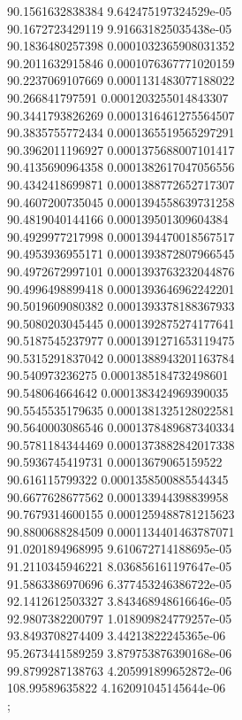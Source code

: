 {90.1561632838384 9.642475197324529e-05
 \\
90.1672723429119 9.916631825035438e-05
 \\
90.1836480257398 0.0001032365908031352
 \\
90.2011632915846 0.0001076367771020159
 \\
90.2237069107669 0.0001131483077188022
 \\
90.266841797591 0.0001203255014843307
 \\
90.3441793826269 0.0001316461275564507
 \\
90.3835755772434 0.0001365519565297291
 \\
90.3962011196927 0.0001375688007101417
 \\
90.4135690964358 0.0001382617047056556
 \\
90.4342418699871 0.0001388772652717307
 \\
90.4607200735045 0.0001394558639731258
 \\
90.4819040144166 0.000139501309604384
 \\
90.4929977217998 0.0001394470018567517
 \\
90.4953936955171 0.0001393872807966545
 \\
90.4972672997101 0.0001393763232044876
 \\
90.4996498899418 0.0001393646962242201
 \\
90.5019609080382 0.0001393378188367933
 \\
90.5080203045445 0.0001392875274177641
 \\
90.5187545237977 0.0001391271653119475
 \\
90.5315291837042 0.0001388943201163784
 \\
90.540973236275 0.0001385184732498601
 \\
90.548064664642 0.0001383424969390035
 \\
90.5545535179635 0.0001381325128022581
 \\
90.5640003086546 0.0001378489687340334
 \\
90.5781184344469 0.0001373882842017338
 \\
90.5936745419731 0.00013679065159522
 \\
90.616115799322 0.0001358500885544345
 \\
90.6677628677562 0.000133944398839958
 \\
90.7679314600155 0.0001259488781215623
 \\
90.8800688284509 0.0001134401463787071
 \\
91.0201894968995 9.610672714188695e-05
 \\
91.2110345946221 8.036856161197647e-05
 \\
91.5863386970696 6.377453246386722e-05
 \\
92.1412612503327 3.843468948616646e-05
 \\
92.9807382200797 1.018909824779257e-05
 \\
93.8493708274409 3.44213822245365e-06
 \\
95.2673441589259 3.879753876390168e-06
 \\
99.8799287138763 4.205991899652872e-06
 \\
108.99589635822 4.162091045145644e-06
 \\
};
